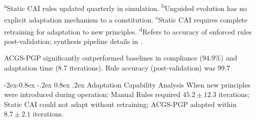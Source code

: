 \documentclass[manuscript,screen,9pt]{acmart}
\makeatletter
\renewcommand\subsubsection{\@startsection{subsubsection}{3}{\z@}%
  {-2ex\@plus -0.8ex \@minus -.2ex}%
  {0.8ex \@plus .2ex}%
  {\normalfont\normalsize\bfseries}}
\makeatother
\begin{document}
\begin{table}[!htb]
\begin{table}[htbp]
\begin{minipage}{\linewidth}\footnotesize \textsuperscript{a}Static CAI rules updated quarterly in simulation. \textsuperscript{b}Unguided evolution has no explicit adaptation mechanism to a constitution. \textsuperscript{c}Static CAI requires complete retraining for adaptation to new principles. \textsuperscript{d}Refers to accuracy of enforced rules post-validation; synthesis pipeline details in .\end{minipage}
\end{table}
ACGS-PGP significantly outperformed baselines in compliance (94.9\%) and adaptation time (8.7 iterations). Rule accuracy (post-validation) was 99.7%

\subsubsection{Adaptation Capability Analysis}
When new principles were introduced during operation: Manual Rules required $45.2 \pm 12.3$ iterations; Static CAI could not adapt without retraining; ACGS-PGP adapted within $8.7 \pm 2.1$ iterations.


\end{table}
\end{document}
